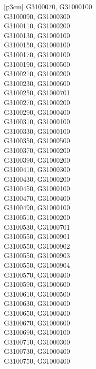 \begin{customLongTable}{ |p{3cm}| }
G3100070, G31000100 \\ \hline
G3100090, G31000300 \\ \hline
G3100110, G31000200 \\ \hline
G3100130, G31000100 \\ \hline
G3100150, G31000100 \\ \hline
G3100170, G31000100 \\ \hline
G3100190, G31000500 \\ \hline
G3100210, G31000200 \\ \hline
G3100230, G31000600 \\ \hline
G3100250, G31000701 \\ \hline
G3100270, G31000200 \\ \hline
G3100290, G31000400 \\ \hline
G3100310, G31000100 \\ \hline
G3100330, G31000100 \\ \hline
G3100350, G31000500 \\ \hline
G3100370, G31000200 \\ \hline
G3100390, G31000200 \\ \hline
G3100410, G31000300 \\ \hline
G3100430, G31000200 \\ \hline
G3100450, G31000100 \\ \hline
G3100470, G31000400 \\ \hline
G3100490, G31000100 \\ \hline
G3100510, G31000200 \\ \hline
G3100530, G31000701 \\ \hline
G3100550, G31000901 \\ \hline
G3100550, G31000902 \\ \hline
G3100550, G31000903 \\ \hline
G3100550, G31000904 \\ \hline
G3100570, G31000400 \\ \hline
G3100590, G31000600 \\ \hline
G3100610, G31000500 \\ \hline
G3100630, G31000400 \\ \hline
G3100650, G31000400 \\ \hline
G3100670, G31000600 \\ \hline
G3100690, G31000100 \\ \hline
G3100710, G31000300 \\ \hline
G3100730, G31000400 \\ \hline
G3100750, G31000400 \\ \hline

\end{customLongTable}

